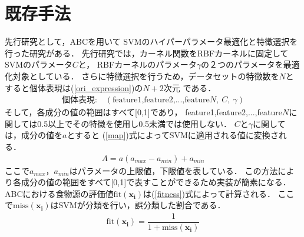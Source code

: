 \section{既存手法}
先行研究として，ABCを用いて
SVMのハイパーパラメータ最適化と特徴選択を行った研究がある\cite{origin}．
先行研究では，カーネル関数をRBFカーネルに固定してSVMのパラメータ$C$と，
RBFカーネルのパラメータ$\gamma$の２つのパラメータを最適化対象としている．
さらに特徴選択を行うため，データセットの特徴数を$N$とすると個体表現は(\ref{ori_expression})の$N+2$次元
である．
\begin{align}
  \text{個体表現:} \quad  (\text{feature1,feature2,...,feature}N,~C,~\gamma)\label{ori_expression}
\end{align}
そして，各成分の値の範囲はすべて[0,1]であり，
feature1,feature2,...,feature$N$に関しては0.5以上でその特徴を使用し0.5未満では使用しない．
$C$と$\gamma$に関しては，成分の値を$a$とすると
(\ref{map})式によってSVMに適用される値に変換される．
\begin{align}
  \label{map}
  A =a(a_{max} -a_{min}) + a_{min}
\end{align}
ここで$a_{max}$，$a_{min}$はパラメータの上限値，下限値を表している．
この方法により各成分の値の範囲をすべて[0,1]で表すことができるため実装が簡素になる．
ABCにおける食物源の評価値$\mathrm{fit}(\boldsymbol{x_{i}})$は(\ref{fitness})式によって計算される．
ここで$\mathrm{miss}(\boldsymbol{x_{i}})$はSVMが分類を行い，誤分類した割合である．
\begin{align}
    \label{fitness}
    \mathrm{fit}(\boldsymbol{x_{i}}) = \dfrac{1}{1+ \mathrm{miss}(\boldsymbol{x_{i}})}
\end{align}